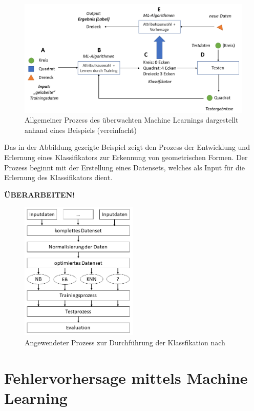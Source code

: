 \begin{figure}[H]
    \centering
    \captionsetup{justification=centering,margin=2cm}
    \includegraphics[width=\textwidth]{images/ML}
    \caption{Allgemeiner Prozess des überwachten Machine Learnings dargestellt anhand eines Beispiels (vereinfacht)}\label{fig:ml}
\end{figure}

Das in der Abbildung gezeigte Beispiel zeigt den Prozess der Entwicklung und Erlernung eines Klassifikators zur Erkennung von geometrischen Formen.
Der Prozess beginnt mit der Erstellung eines Datensets, welches als Input für die Erlernung des Klassifikators dient.

\textbf{ÜBERARBEITEN!}

\begin{figure}[H]
    \centering
    \includegraphics[width=0.5\textwidth]{images/Prozess}
    \caption{Angewendeter Prozess zur Durchführung der Klassfikation nach \cite{Ceylan2006}}\label{fig:process}
\end{figure}

\section{Fehlervorhersage mittels Machine Learning}

